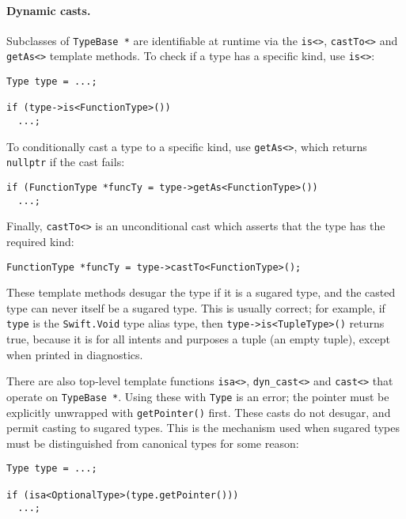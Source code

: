 \documentclass[../generics]{subfiles}
\begin{document}
\paragraph{Dynamic casts.}
Subclasses of \texttt{TypeBase *} are identifiable at runtime via the \verb|is<>|, \verb|castTo<>| and \verb|getAs<>| template methods. To check if a type has a specific kind, use \verb|is<>|:
\begin{Verbatim}
Type type = ...;

if (type->is<FunctionType>())
  ...;
\end{Verbatim}
To conditionally cast a type to a specific kind, use \verb|getAs<>|, which returns \verb|nullptr| if the cast fails:
\begin{Verbatim}
if (FunctionType *funcTy = type->getAs<FunctionType>())
  ...;
\end{Verbatim}
Finally, \verb|castTo<>| is an unconditional cast which asserts that the type has the required kind:
\begin{Verbatim}
FunctionType *funcTy = type->castTo<FunctionType>();
\end{Verbatim}
These template methods desugar the type if it is a sugared type, and the casted type can never itself be a sugared type. This is usually correct; for example, if \texttt{type} is the \texttt{Swift.Void} type alias type, then \texttt{type->is<TupleType>()} returns true, because it is for all intents and purposes a tuple (an empty tuple), except when printed in diagnostics.

There are also top-level template functions \verb|isa<>|, \verb|dyn_cast<>| and \verb|cast<>| that operate on \texttt{TypeBase *}. Using these with \texttt{Type} is an error; the pointer must be explicitly unwrapped with \texttt{getPointer()} first. These casts do not desugar, and permit casting to sugared types. This is the mechanism used when sugared types must be distinguished from canonical types for some reason:
\begin{Verbatim}
Type type = ...;

if (isa<OptionalType>(type.getPointer()))
  ...;
\end{Verbatim}
\end{document}
